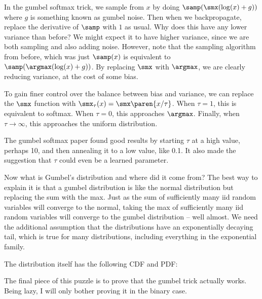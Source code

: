 \documentclass[12pt]{article}
\begin{document}
In the gumbel softmax trick, we sample from $x$ by doing $\samp(\smx(\log(x)+g))$ where $g$ is something known as gumbel noise. Then when we backpropagate, replace the derivative of $\samp$ with $1$ as usual. Why does this have any lower variance than before? We might expect it to have higher variance, since we are both sampling and also adding noise. However, note that the sampling algorithm from before, which was just $\samp(x)$ is equivalent to $\samp(\argmax(\log(x)+g))$. By replacing $\smx$ with $\argmax$, we are clearly reducing variance, at the cost of some bias.

To gain finer control over the balance between bias and variance, we can replace the $\smx$ function with $\smx_\tau(x) = \smx\paren{x/\tau}$. When $\tau = 1$, this is equivalent to softmax. When $\tau = 0$, this approaches $\argmax$. Finally, when $\tau \rightarrow \infty$, this approaches the uniform distribution.

The gumbel softmax paper found good results by starting $\tau$ at a high value, perhaps 10, and then annealing it to a low value, like 0.1. It also made the suggestion that $\tau$ could even be a learned parameter. 

Now what is Gumbel's distribution and where did it come from? The best way to explain it is that a gumbel distribution is like the normal distribution but replacing the sum with the max. Just as the sum of sufficiently many iid random variables will converge to the normal, taking the max of sufficiently many iid random variables will converge to the gumbel distribution -- well almost. We need the additional assumption that the distributions have an exponentially decaying tail, which is true for many distributions, including everything in the exponential family.

The distribution itself has the following CDF and PDF:


The final piece of this puzzle is to prove that the gumbel trick actually works. Being lazy, I will only bother proving it in the binary case. 
\end{document}
